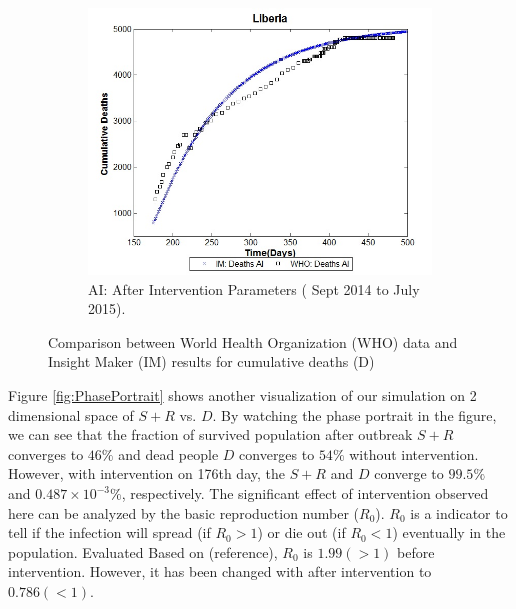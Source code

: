 \begin{figure}[h!]
\begin{subfigure}[b]{0.38\textwidth}
 \includegraphics[width=\textwidth]{LB_AI_SD_WHO_IM} \caption{AI: After Intervention Parameters  ( Sept 2014 to July 2015).} \label{fig:LB_AI_SD_WHO_IM} \end{subfigure} 
\caption{Comparison between World Health Organization (WHO) data and Insight Maker (IM) results for cumulative deaths (D)}
\label{fig:LB_IM_WHO} 
\end{figure}


%
%

Figure \ref{fig:PhasePortrait} shows another visualization of our simulation on 2 dimensional space of $S+R$ vs. $D$. By watching the phase portrait in the figure, we can see that the fraction of survived population after outbreak $S+R$ converges to $46\%$ and dead people $D$ converges to $54\%$ without intervention. However, with intervention on 176th day, the $S+R$ and $D$ converge to $99.5\%$ and $0.487 \times10^{-3}\%$, respectively. The significant effect of intervention observed here can be analyzed by the basic reproduction number ($R_0$). $R_0$ is a indicator to tell if the infection will spread (if $R_0>1$) or die out (if $R_0<1$) eventually in the population. Evaluated Based on (reference), $R_0$ is $1.99 (>1)$ before intervention. However, it has been changed with after intervention to $0.786(<1)$.


